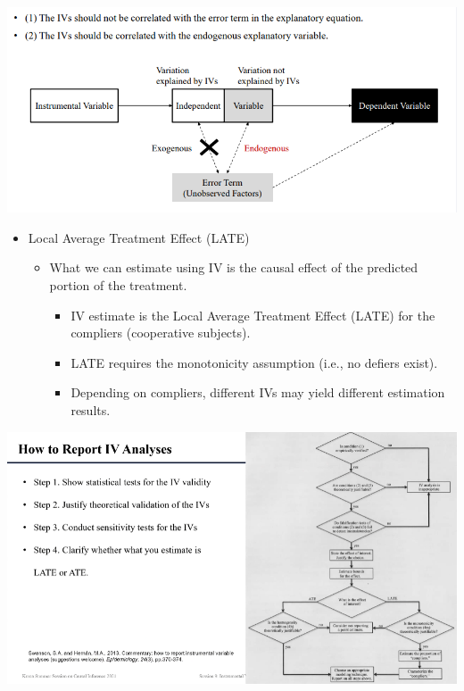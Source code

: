 \documentclass[
]{book}
\providecommand{\tightlist}{%
  \setlength{\itemsep}{0pt}\setlength{\parskip}{0pt}}
\theoremstyle{definition}
\theoremstyle{definition}
\theoremstyle{definition}
\theoremstyle{definition}
\theoremstyle{remark}
\begin{document}
\includegraphics{figures/56.png}

\begin{itemize}
\tightlist
\item
  Local Average Treatment Effect (LATE)

  \begin{itemize}
  \tightlist
  \item
    What we can estimate using IV is the causal effect of the predicted portion of the treatment.

    \begin{itemize}
    \tightlist
    \item
      IV estimate is the Local Average Treatment Effect (LATE) for the compliers (cooperative subjects).
    \item
      LATE requires the monotonicity assumption (i.e., no defiers exist).
    \item
      Depending on compliers, different IVs may yield different estimation results.
    \end{itemize}
  \end{itemize}
\end{itemize}

\includegraphics{figures/57.png}
\end{document}
